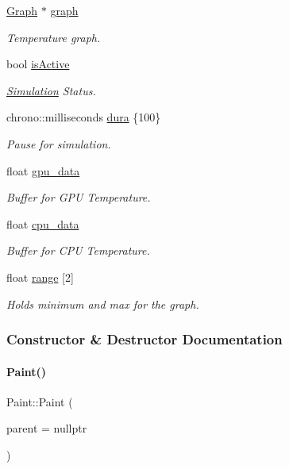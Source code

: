 \begin{DoxyCompactItemize}
\mbox{\hyperlink{classGraph}{Graph}} $\ast$ \mbox{\hyperlink{classPaint_a7c4451334289c681e3763ba244227b7a}{graph}}
\begin{DoxyCompactList}\small\item\em Temperature graph. \end{DoxyCompactList}\item 
bool \mbox{\hyperlink{classPaint_ad3674af36118608e17d5f49812f0e398}{is\+Active}}
\begin{DoxyCompactList}\small\item\em \mbox{\hyperlink{classSimulation}{Simulation}} Status. \end{DoxyCompactList}\item 
chrono\+::milliseconds \mbox{\hyperlink{classPaint_a596f261f63bbc34d4ec35639eeb148ce}{dura}} \{100\}
\begin{DoxyCompactList}\small\item\em Pause for simulation. \end{DoxyCompactList}\item 
float \mbox{\hyperlink{classPaint_a561a7ed14d82369f8a88ba76b0bcbb7e}{gpu\+\_\+data}}
\begin{DoxyCompactList}\small\item\em Buffer for G\+PU Temperature. \end{DoxyCompactList}\item 
float \mbox{\hyperlink{classPaint_a289c2a24e5186491ddd37a620eaac8b2}{cpu\+\_\+data}}
\begin{DoxyCompactList}\small\item\em Buffer for C\+PU Temperature. \end{DoxyCompactList}\item 
float \mbox{\hyperlink{classPaint_a7c7236ff4eb95bce87e4700dbc3385eb}{range}} \mbox{[}2\mbox{]}
\begin{DoxyCompactList}\small\item\em Holds minimum and max for the graph. \end{DoxyCompactList}\end{DoxyCompactItemize}


\subsubsection{Constructor \& Destructor Documentation}
\mbox{\label{classPaint_a3be358e4052f20b7342f17a37fc32c4e}} 
\paragraph{\texorpdfstring{Paint()}{Paint()}}
{\footnotesize\ttfamily Paint\+::\+Paint (\begin{DoxyParamCaption}\item[{Q\+Widget $\ast$}]{parent = {\ttfamily nullptr} }\end{DoxyParamCaption})\hspace{0.3cm}{\ttfamily [explicit]}}

